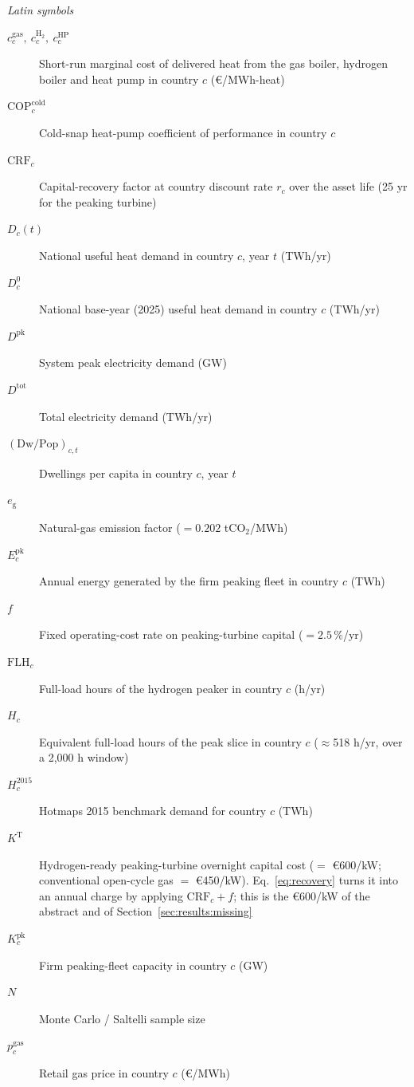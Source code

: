 \documentclass[review]{elsarticle}
\begin{document}
\textit{Latin symbols}
\begin{description}
 \item[$c^{\mathrm{gas}}_{c},\ c^{\mathrm{H_2}}_{c},\ c^{\mathrm{HP}}_{c}$] Short-run marginal cost of delivered heat from the gas boiler, hydrogen boiler and heat pump in country $c$ (\euro{}/MWh-heat)
 \item[$\mathrm{COP}^{\mathrm{cold}}_{c}$] Cold-snap heat-pump coefficient of performance in country $c$
 \item[$\mathrm{CRF}_{c}$] Capital-recovery factor at country discount rate $r_{c}$ over
the asset life (25 yr for the peaking turbine)
 \item[$D_{c}(t)$] National useful heat demand in country $c$, year $t$ (TWh/yr)
 \item[$D_{c}^{0}$] National base-year (2025) useful heat demand in country $c$ (TWh/yr)
 \item[$D^{\mathrm{pk}}$] System peak electricity demand (GW)
 \item[$D^{\mathrm{tot}}$] Total electricity demand (TWh/yr)
 \item[$(\mathrm{Dw}/\mathrm{Pop})_{c,t}$] Dwellings per capita in country $c$, year $t$
 \item[$e_{\mathrm{g}}$] Natural-gas emission factor ($=0.202$ tCO$_2$/MWh)
  \item[$E^{\mathrm{pk}}_{c}$] Annual energy generated by the firm peaking fleet in country $c$ (TWh)
 \item[$f$] Fixed operating-cost rate on peaking-turbine capital ($=2.5\,\%$/yr)
 \item[$\mathrm{FLH}_{c}$] Full-load hours of the hydrogen peaker in country $c$ (h/yr)
 \item[$H_{c}$] Equivalent full-load hours of the peak slice in country $c$ ($\approx$518 h/yr, over a 2{,}000 h window)
 \item[$H_{c}^{2015}$] Hotmaps 2015 benchmark demand for country $c$ (TWh)
 \item[$K^{\mathrm{T}}$] Hydrogen-ready peaking-turbine overnight capital cost ($=$
\euro{}600/kW; conventional open-cycle gas $=$ \euro{}450/kW). Eq.~\eqref{eq:recovery}
turns it into an annual charge by applying $\mathrm{CRF}_{c}+f$; this is the
\euro{}600/kW of the abstract and of Section~\ref{sec:results:missing}
 \item[$K^{\mathrm{pk}}_{c}$] Firm peaking-fleet capacity in country $c$ (GW)
 \item[$N$] Monte Carlo / Saltelli sample size
 \item[$p^{\mathrm{gas}}_{c}$] Retail gas price in country $c$ (\euro{}/MWh)

\end{description}
\end{document}
